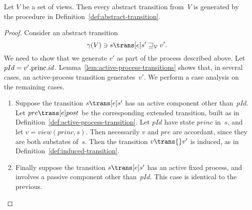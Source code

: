 
\begin{prop}
\label{lem:abstract-transitions-sound}
Let $V$ be a set of views.  Then every abstract transition from~$V$ is
generated by the procedure in Definition~\ref{def:abstract-transition}.
\end{prop}

\begin{proof} 
Consider an abstract transition
\[
\gamma(V) \ni s \trans[e] s' \sqge_{\V} v'.
\]
We need to show that we generate $v'$ as part of the process described above.
%
Let $pId = v'.\mathrm{princ}.id$.
%
Lemma~\ref{lem:active-process-transitions} shows that, in several cases, an
active-process transition generates~$v'$. 
%
We perform a case analysis on the remaining cases.
%
\begin{enumerate}

\item
Suppose the transition $s \trans[e] s'$ has an active component other
than~$pId$.  Let $pre \trans[e] post$ be the corresponding extended
transition, built as in Definition~\ref{def:active-process-transition}.  Let
$pId$ have state $princ$ in~$s$, and let
$v = view(princ, s)$.  Then necessarily $v$ and $pre$ are accordant, since
they are both substates of~$s$.  Then the transition $v \trans{} v'$ is
induced, as in Definition~\ref{def:induced-transition}.

\item\label{step:abs-trans-correct-3}
Finally suppose the transition $s \trans[e] s'$ has an active fixed process,
and involves a passive component other than~$pId$.  This case is identical to
the previous.
\end{enumerate}
\end{proof}

